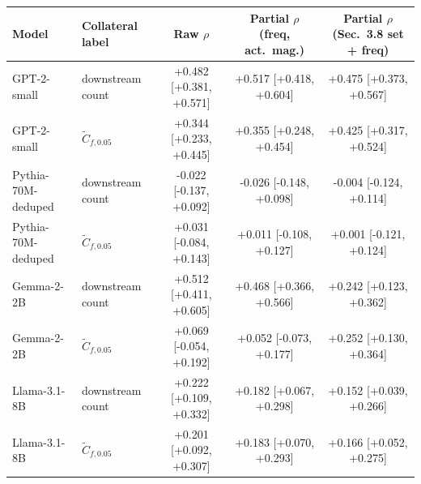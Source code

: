 \begin{tabular}{llccc}
\toprule
Model & Collateral label & Raw $\rho$ & Partial $\rho$ (freq, act.\ mag.) & Partial $\rho$ (Sec.~3.8 set + freq) \\
\midrule
GPT-2-small & downstream count & +0.482 [+0.381, +0.571] & +0.517 [+0.418, +0.604] & +0.475 [+0.373, +0.567] \\
GPT-2-small & $\widetilde{C}_{f,0.05}$ & +0.344 [+0.233, +0.445] & +0.355 [+0.248, +0.454] & +0.425 [+0.317, +0.524] \\
Pythia-70M-deduped & downstream count & -0.022 [-0.137, +0.092] & -0.026 [-0.148, +0.098] & -0.004 [-0.124, +0.114] \\
Pythia-70M-deduped & $\widetilde{C}_{f,0.05}$ & +0.031 [-0.084, +0.143] & +0.011 [-0.108, +0.127] & +0.001 [-0.121, +0.124] \\
Gemma-2-2B & downstream count & +0.512 [+0.411, +0.605] & +0.468 [+0.366, +0.566] & +0.242 [+0.123, +0.362] \\
Gemma-2-2B & $\widetilde{C}_{f,0.05}$ & +0.069 [-0.054, +0.192] & +0.052 [-0.073, +0.177] & +0.252 [+0.130, +0.364] \\
Llama-3.1-8B & downstream count & +0.222 [+0.109, +0.332] & +0.182 [+0.067, +0.298] & +0.152 [+0.039, +0.266] \\
Llama-3.1-8B & $\widetilde{C}_{f,0.05}$ & +0.201 [+0.092, +0.307] & +0.183 [+0.070, +0.293] & +0.166 [+0.052, +0.275] \\
\bottomrule
\end{tabular}

